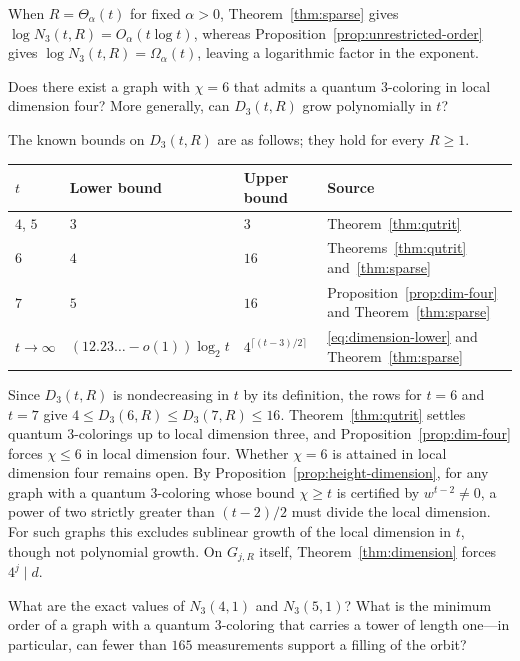 When $R=\Theta_\alpha(t)$ for fixed $\alpha>0$, Theorem~\ref{thm:sparse} gives $\log N_3(t,R)=O_\alpha(t\log t)$, whereas Proposition~\ref{prop:unrestricted-order} gives $\log N_3(t,R)=\Omega_\alpha(t)$, leaving a logarithmic factor in the exponent.

\begin{problem}\label{prob:dimension}
Does there exist a graph with $\chi=6$ that admits a quantum $3$-coloring in local dimension four? More generally, can $D_3(t,R)$ grow polynomially in $t$?
\end{problem}

The known bounds on $D_3(t,R)$ are as follows; they hold for every $R\ge1$.
\begin{center}
\small
\begin{tabular}{@{}llll@{}}
\toprule
$t$ & Lower bound & Upper bound & Source \\
\midrule
$4$, $5$ & $3$ & $3$ & Theorem~\ref{thm:qutrit} \\
$6$ & $4$ & $16$ & Theorems~\ref{thm:qutrit} and~\ref{thm:sparse} \\
$7$ & $5$ & $16$ & Proposition~\ref{prop:dim-four} and Theorem~\ref{thm:sparse} \\
$t\to\infty$ & $(12.23\ldots-o(1))\log_2 t$ & $4^{\lceil(t-3)/2\rceil}$ & \eqref{eq:dimension-lower} and Theorem~\ref{thm:sparse} \\
\bottomrule
\end{tabular}
\end{center}
Since $D_3(t,R)$ is nondecreasing in $t$ by its definition, the rows for $t=6$ and $t=7$ give $4\le D_3(6,R)\le D_3(7,R)\le16$. Theorem~\ref{thm:qutrit} settles quantum $3$-colorings up to local dimension three, and Proposition~\ref{prop:dim-four} forces $\chi\le6$ in local dimension four. Whether $\chi=6$ is attained in local dimension four remains open. By Proposition~\ref{prop:height-dimension}, for any graph with a quantum $3$-coloring whose bound $\chi\ge t$ is certified by $w^{t-2}\ne0$, a power of two strictly greater than $(t-2)/2$ must divide the local dimension. For such graphs this excludes sublinear growth of the local dimension in $t$, though not polynomial growth. On $G_{j,R}$ itself, Theorem~\ref{thm:dimension} forces $4^j\mid d$.

\begin{problem}\label{prob:finite}
What are the exact values of $N_3(4,1)$ and $N_3(5,1)$? What is the minimum order of a graph with a quantum $3$-coloring that carries a tower of length one---in particular, can fewer than $165$ measurements support a filling of the orbit?
\end{problem}

